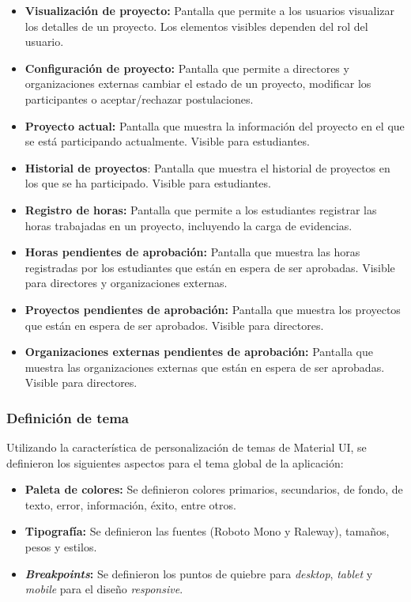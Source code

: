 \begin{itemize}
            dependen del rol del usuario.
    \item \textbf{Visualización de proyecto:} Pantalla que permite a los usuarios visualizar los detalles de un proyecto. Los elementos
            visibles dependen del rol del usuario.
    \item \textbf{Configuración de proyecto:} Pantalla que permite a directores y organizaciones externas cambiar el estado de un proyecto,
            modificar los participantes o aceptar/rechazar postulaciones.
    \item \textbf{Proyecto actual:} Pantalla que muestra la información del proyecto en el que se está participando actualmente.
        Visible para estudiantes.
    \item \textbf{Historial de proyectos}: Pantalla que muestra el historial de proyectos en los que se ha participado. Visible para
        estudiantes.
    \item \textbf{Registro de horas:} Pantalla que permite a los estudiantes registrar las horas trabajadas en un proyecto, incluyendo
        la carga de evidencias.
    \item \textbf{Horas pendientes de aprobación:} Pantalla que muestra las horas registradas por los estudiantes que están en espera
        de ser aprobadas. Visible para directores y organizaciones externas.
    \item \textbf{Proyectos pendientes de aprobación:} Pantalla que muestra los proyectos que están en espera de ser aprobados.
        Visible para directores.
    \item \textbf{Organizaciones externas pendientes de aprobación:} Pantalla que muestra las organizaciones externas que están en espera de
            ser aprobadas. Visible para directores.
\end{itemize}

\subsubsection{Definición de tema}
Utilizando la característica de personalización de temas de Material UI, se definieron los siguientes aspectos para el tema global de
la aplicación:
\begin{itemize}
    \item \textbf{Paleta de colores:} Se definieron colores primarios, secundarios, de fondo, de texto, error, información, éxito,
        entre otros.
    \item \textbf{Tipografía:} Se definieron las fuentes (Roboto Mono y Raleway), tamaños, pesos y estilos.
    \item \textbf{\textit{Breakpoints}:} Se definieron los puntos de quiebre para \textit{desktop}, \textit{tablet} y \textit{mobile}
            para el diseño \textit{responsive}.
\end{itemize}

